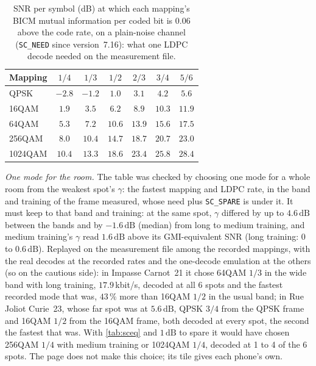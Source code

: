 \documentclass[11pt,a4paper]{article}
\newcommand{\dB}{\,\mathrm{dB}}
\newcommand{\code}[1]{\texttt{#1}}
\theoremstyle{remark}
\begin{document}
\begin{table}[ht]
\centering
\caption{SNR per symbol (dB) at which each mapping's BICM mutual information per coded bit is $0.06$ above the code rate, on a plain-noise channel (\code{SC\_NEED} since version~7.16): what one LDPC decode needed on the measurement file.}
\label{tab:sceq16}
\small
\begin{tabular}{lcccccc}
\toprule
Mapping & $1/4$ & $1/3$ & $1/2$ & $2/3$ & $3/4$ & $5/6$\\
\midrule
QPSK & $-2.8$ & $-1.2$ & $1.0$ & $3.1$ & $4.2$ & $5.6$\\
16QAM & $1.9$ & $3.5$ & $6.2$ & $8.9$ & $10.3$ & $11.9$\\
64QAM & $5.3$ & $7.2$ & $10.6$ & $13.9$ & $15.6$ & $17.5$\\
256QAM & $8.0$ & $10.4$ & $14.7$ & $18.7$ & $20.7$ & $23.0$\\
1024QAM & $10.4$ & $13.3$ & $18.6$ & $23.4$ & $25.8$ & $28.4$\\
\bottomrule
\end{tabular}
\end{table}

\emph{One mode for the room.} The table was checked by choosing one mode for a whole room from the weakest spot's $\gamma$: the fastest mapping and LDPC rate, in the band and training of the frame measured, whose need plus \code{SC\_SPARE} is under it. It must keep to that band and training: at the same spot, $\gamma$ differed by up to $4.6\dB$ between the bands and by $-1.6\dB$ (median) from long to medium training, and medium training's $\gamma$ read $1.6\dB$ above its GMI-equivalent SNR (long training: 0 to $0.6\dB$). Replayed on the measurement file among the recorded mappings, with the real decodes at the recorded rates and the one-decode emulation at the others (so on the cautious side): in Impasse Carnot~21 it chose 64QAM $1/3$ in the wide band with long training, $17.9$\,kbit/s, decoded at all 6 spots and the fastest recorded mode that was, $43\,\%$ more than 16QAM $1/2$ in the usual band; in Rue Joliot Curie~23, whose far spot was at $5.6\dB$, QPSK $3/4$ from the QPSK frame and 16QAM $1/2$ from the 16QAM frame, both decoded at every spot, the second the fastest that was. With \cref{tab:sceq} and $1\dB$ to spare it would have chosen 256QAM $1/4$ with medium training or 1024QAM $1/4$, decoded at 1 to 4 of the 6 spots. The page does not make this choice; its tile gives each phone's own.
\end{document}
